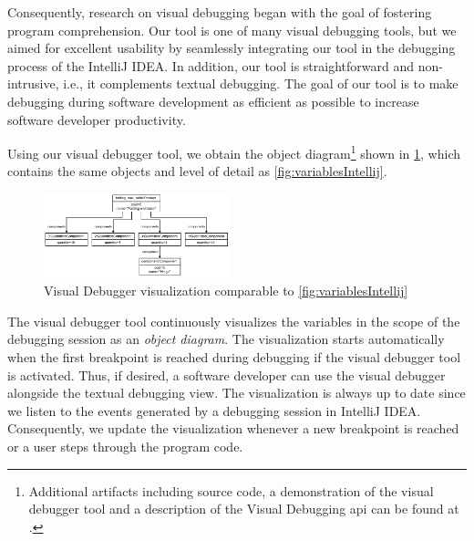 \documentclass[conference]{IEEEtran}
\newcommand{\intellij}{IntelliJ IDEA}
\begin{document}
Consequently, research on visual debugging began with the goal of fostering program comprehension.
Our tool is one of many visual debugging tools, but we aimed for excellent usability by seamlessly integrating our tool in the debugging process of the \intellij{}.
In addition, our tool is straightforward and non-intrusive, i.e., it complements textual debugging.
The goal of our tool is to make debugging during software development as efficient as possible to increase software developer productivity.

Using our visual debugger tool, we obtain the object diagram\footnote{\label{footnote:artifacts} Additional artifacts including source code, a demonstration of the visual debugger tool and a description of the Visual Debugging \acrshort*{api} can be found at \cite{ArtifactsICSME2022}.} shown in \cref{fig:visualDebuggerVariables}, which contains the same objects and level of detail as \cref{fig:variablesIntellij}.

\begin{figure}[h]
    \centering
    \includegraphics[width=0.48\textwidth]{images/VD-partsList-objects.pdf}
    \caption{Visual Debugger visualization comparable to \cref{fig:variablesIntellij}}
    \label{fig:visualDebuggerVariables}
\end{figure}

The visual debugger tool continuously visualizes the variables in the scope of the debugging session as an \textit{object diagram}.
The visualization starts automatically when the first breakpoint is reached during debugging if the visual debugger tool is activated.
Thus, if desired, a software developer can use the visual debugger alongside the textual debugging view.
The visualization is always up to date since we listen to the events generated by a debugging session in \intellij{}.
Consequently, we update the visualization whenever a new breakpoint is reached or a user steps through the program code.
\end{document}

